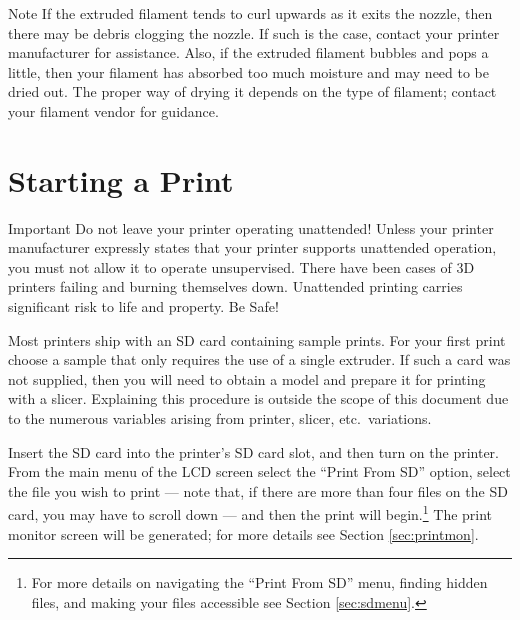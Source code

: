 \begin{bclogo}[logo=\bcinfo, noborder=true, couleurBarre=yellow]{Note}
If the extruded filament tends to curl upwards as it exits the nozzle, then there may be debris clogging the nozzle.  If such is the case, contact your printer manufacturer for assistance.  Also, if the extruded filament bubbles and pops a little, then your filament has absorbed too much moisture and may need to be dried out.  The proper way of drying it depends on the type of filament; contact your filament vendor for guidance.
\end{bclogo}



\section{Starting a Print}

\begin{bclogo}[logo=\bcattention, noborder=true, couleurBarre=red]{Important}
Do not leave your printer operating unattended!  Unless your printer manufacturer expressly states that your printer supports unattended operation, you must not allow it to operate unsupervised.  There have been cases of 3D printers failing and burning themselves down.  Unattended printing carries significant risk to life and property.  Be Safe!
\end{bclogo}

Most printers ship with an \gls{SD card} containing sample prints.  For your first print choose a sample that only requires the use of a single extruder.  If such a card was not supplied, then you will need to obtain a model and prepare it for printing with a \gls{slicer}.  Explaining this procedure is outside the scope of this document due to the numerous variables arising from printer, slicer, etc.\ variations.

Insert the SD card into the printer's SD card slot, and then turn on the printer.  From the main menu of the LCD screen select the ``Print From SD'' option, select the file you wish to print --- note that, if there are more than four files on the SD card, you may have to scroll down --- and then the print will begin.\footnote{For more details on navigating the ``Print From SD'' menu, finding hidden files, and making your files accessible see Section \ref{sec:sdmenu}.}  The print monitor screen will be generated; for more details see Section \ref{sec:printmon}.

